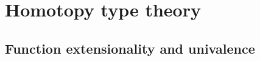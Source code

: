 \documentclass[hott-all.tex]{subfiles}
\begin{document}
%

\section{Homotopy type theory}


\subsection{Function extensionality and univalence}

\end{document}
